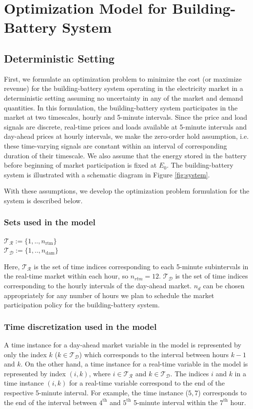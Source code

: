 \documentclass[11pt,twoside]{article}
\begin{document}
\section{Optimization Model for Building-Battery System}\label{sec:model}
\subsection{Deterministic Setting}\label{subsec:deterministic}
First, we formulate an optimization problem to minimize the cost (or maximize revenue) for the building-battery system operating in the electricity market in a deterministic setting assuming no uncertainty in any of the market and demand quantities. In this formulation, the building-battery system participates in the market at two timescales, hourly and 5-minute intervals. Since the price and load signals are discrete, real-time prices and loads available at 5-minute intervals and day-ahead prices at hourly intervals, we make the zero-order hold assumption, i.e. these time-varying signals are constant within an interval of corresponding duration of their timescale. We also assume that the energy stored in the battery before beginning of market participation is fixed at $E_{0}$. The building-battery system is illustrated with a schematic diagram in Figure \ref{fig:system}.

With these assumptions, we develop the optimization problem formulation for the system is described below.
\subsubsection{Sets used in the model}
\begin{center}
$\mathcal{T_R} := \{1,..,n_{\textrm{rtm}}\}$\\$ \mathcal{T_D} :=  \{1,..,n_{\textrm{dam}}\}$
\end{center}
Here, $\mathcal{T_R}$ is the set of time indices corresponding to each 5-minute subintervals in the real-time market within each hour, so $n_{rtm}=12$. $\mathcal{T_D}$ is the set of time indices corresponding to the hourly intervals of the day-ahead market. $n_d$ can be chosen appropriately for any number of hours we plan to schedule the market participation policy for the building-battery system.
\subsubsection{Time discretization used in the model}
A time instance for a day-ahead market variable in the model is represented by only the index $k$ ($k \in \mathcal{T_D}$) which corresponds to the interval between hours $k-1$ and $k$. On the other hand, a time instance for a real-time variable in the model is represented by index $(i,k)$, where $i \in \mathcal{T_R}$ and $ k \in \mathcal{T_D}$. The indices $i$ and $k$ in a time instance $(i,k)$ for a real-time variable correspond to the end of the respective 5-minute interval. For example, the time instance ($5,7$) corresponds to the end of the interval between $4^{\text{th}}$ and $5^{\text{th}}$ 5-minute interval within the $7^\textrm{th}$ hour. 
\end{document}
